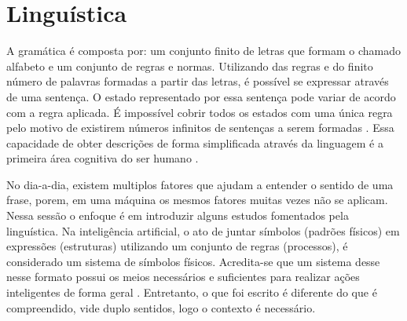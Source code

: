 \section{Linguística}
A gramática é composta por: um conjunto finito de letras que formam o chamado alfabeto e um conjunto de regras e normas. Utilizando das regras e do finito número de palavras formadas a partir das letras, é possível se expressar através de uma sentença. O estado representado por essa sentença pode variar de acordo com a regra aplicada. É impossível cobrir todos os estados com uma única regra pelo motivo de existirem números infinitos de sentenças a serem formadas \cite[13-25]{chomsky2002syntactic}. Essa capacidade de obter descrições de forma simplificada através da linguagem é a primeira área cognitiva do ser humano \cite[131]{putnam1975mind}.

No dia-a-dia, existem multiplos fatores que ajudam a entender o sentido de uma frase, porem, em uma máquina os mesmos fatores muitas vezes não se aplicam. Nessa sessão o enfoque é em introduzir alguns estudos fomentados pela linguística. Na inteligência artificial, o ato de juntar símbolos (padrões físicos) em expressões (estruturas) utilizando um conjunto de regras (processos), é considerado um sistema de símbolos físicos. Acredita-se que um sistema desse nesse formato possui os meios necessários e suficientes para realizar ações inteligentes de forma geral \cite[116]{newell1976ComputerSA}. Entretanto, o que foi escrito é diferente do que é compreendido, vide duplo sentidos, logo o contexto é necessário.



